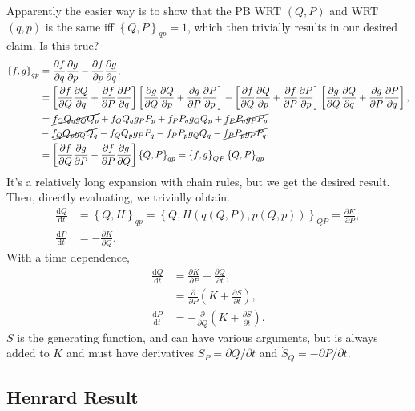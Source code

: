 \documentclass[12pt]{article}
\newcommand*{\rd}[2]{\frac{\mathrm{d}#1}{\mathrm{d}#2}}
\newcommand*{\pd}[2]{\frac{\partial#1}{\partial#2}}
\newcommand*{\pdil}[2]{\partial#1 / \partial#2}
\newcommand*{\p}[1]{\left(#1\right)}
\newcommand*{\s}[1]{\left[#1\right]}
\newcommand*{\z}[1]{\left\{#1\right\}}
\begin{document}
Apparently the easier way is to show that the PB WRT $(Q, P)$ and WRT $(q, p)$
is the same iff $\z{Q, P}_{qp} = 1$, which then trivially results in our desired
claim. Is this true?
\begin{align}
    \z{f, g}_{qp} &= \pd{f}{q}\pd{g}{p} - \pd{f}{p}\pd{g}{q},\\
        &= \s{\pd{f}{Q}\pd{Q}{q}
            + \pd{f}{P}\pd{P}{q}}
            \s{\pd{g}{Q}\pd{Q}{p}
            + \pd{g}{P}\pd{P}{p}}
            - \s{\pd{f}{Q}\pd{Q}{p}
            + \pd{f}{P}\pd{P}{p}}
            \s{\pd{g}{Q}\pd{Q}{q}
            + \pd{g}{P}\pd{P}{q}},\\
        &= \cancel{f_Q Q_q g_Q Q_p} + f_QQ_q g_PP_p
            + f_PP_qg_QQ_p + \cancel{f_PP_qg_PP_p}\nonumber\\
        & - \cancel{f_QQ_pg_QQ_q} - f_QQ_pg_PP_q
            - f_PP_pg_QQ_q - \cancel{f_PP_pg_PP_q},\\
        &= \s{\pd{f}{Q}\pd{g}{P} - \pd{f}{P}\pd{g}{Q}}\z{Q, P}_{qp}
            = \z{f, g}_{QP}\z{Q, P}_{qp}
\end{align}
It's a relatively long expansion with chain rules, but we get the desired
result. Then, directly evaluating, we trivially obtain.
\begin{align}
    \rd{Q}{t} &= \z{Q, H}_{qp} = \z{Q, H\p{q(Q, P), p(Q, p)}}_{QP}
        = \pd{K}{P},\\
    \rd{P}{t} &= -\pd{K}{Q}.
\end{align}
With a time dependence,
\begin{align}
    \rd{Q}{t} &= \pd{K}{P} + \pd{Q}{t},\\
        &= \pd{}{P}\p{K + \pd{S}{t}},\\
    \rd{P}{t} &= -\pd{}{Q}\p{K + \pd{S}{t}}.
\end{align}
$S$ is the generating function, and can have various arguments, but is always
added to $K$ and must have derivatives $\dot{S}_P = \pdil{Q}{t}$ and $\dot{S}_Q
= -\pdil{P}{t}$.

\subsection{Henrard Result}
\end{document}
